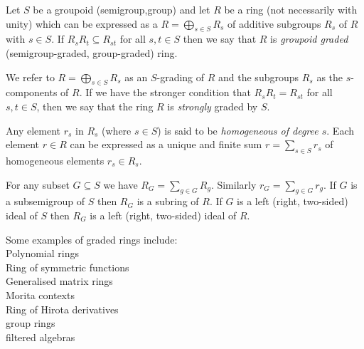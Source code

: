 \documentclass[12pt]{article}
\newcommand{\supp}{\,{\rm supp}\,}
\begin{document}
Let $S$ be a groupoid (semigroup,group) and let $R$ be a ring (not necessarily with unity) which can be expressed as a  $R = {\bigoplus}_{s \in S} R_{s}$ of additive subgroups $R_{s}$ of $R$ with $s \in S$.  If $R_{s} R_{t} \subseteq R_{st}$ for all $s,t \in S$ then we say that $R$ is {\em groupoid graded} (semigroup-graded, group-graded) ring.

We refer to $R = \bigoplus_{s\in S} R_{s}$ as an $S$-grading of
$R$ and the subgroups $R_{s}$ as the
$s$-components of $R$. If we have the stronger
condition that $R_{s}R_{t} = R_{st}$ for all $s,t \in S$, then we say that the ring $R$ is {\em
strongly} graded by
$S$. 

Any element $r_{s}$ in $R_{s}$ (where $s\in S$) is said to be {\em homogeneous of degree
$s$}. Each element $r \in R$ can be expressed as a unique and finite sum $r =
\sum_{s \in S} r_{s}$ of homogeneous elements $r_{s} \in R_{s}$. 


For any subset $G \subseteq S$ we have $R_{G} = \sum_{g \in G} R_{g}$.
Similarly $r_{G} = \sum_{g \in G} r_{g}$.  If $G$ is a subsemigroup of $S$ then
$R_{G}$ is a subring of $R$.  If $G$ is a left (right, two-sided) ideal of $S$
then $R_{G}$ is a left (right, two-sided) ideal of $R$.

Some examples of graded rings include:\\
Polynomial rings\\
Ring of symmetric functions\\
Generalised matrix rings\\
Morita contexts\\
Ring of Hirota derivatives\\
group rings\\
filtered algebras\\


\end{document}
